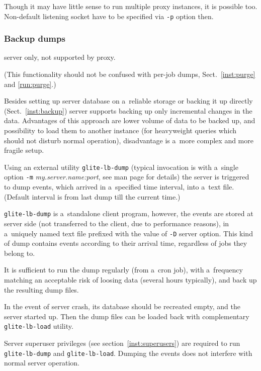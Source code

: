 Though it may have little sense to run multiple \LB proxy instances, it is possible too.
Non-default listening socket have to be specified via \verb'-p' option then.



\subsubsection{Backup dumps}

\LB server only, not supported by proxy.

(This functionality should not be confused with per-job dumps, Sect.~\ref{inst:purge} and \ref{run:purge}.)

Besides setting up \LB server database on a~reliable storage or
backing it up directly (Sect.~\ref{inst:backup})
\LB server supports backing up only incremental changes in the data.
Advantages of this approach are lower volume of data to be backed up,
and possibility to load them to another instance (\eg for heavyweight
queries which should not disturb normal operation), disadvantage is
a~more complex and more fragile setup. 

Using an external utility \verb'glite-lb-dump' (typical invocation is with
a~single option \verb'-m' \emph{my.server.name:port}, see man page for
details) the server is triggered to dump events, which arrived in
a~specified time interval, into a~text file. (Default interval is from last
dump till the current time.)

\verb'glite-lb-dump' is a~standalone client program, however, 
the events are stored at server side (\ie not transferred to the client,
due to performance reasons),
in a~uniquely named text
file prefixed with the value of \verb'-D' server option. This kind of dump
contains events according to their arrival time, regardless of jobs they belong
to.

It is sufficient to run the dump regularly (from a~cron job), with a~frequency
matching an acceptable risk of loosing data (several hours typically), and back
up the resulting dump files. 

In the event of server crash, its database should be recreated empty,
and the server started up.
Then the dump files can be loaded back with complementary
\verb'glite-lb-load' utility.

Server superuser privileges (see section~\ref{inst:superusers}) are required to run \verb'glite-lb-dump' and \verb'glite-lb-load'.
Dumping the events does not interfere with normal server operation.


